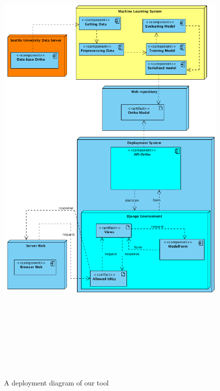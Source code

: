 \documentclass[12pt, french]{report}
\begin{document}
\begin{figure}[h]
	\includegraphics[width=17cm, height=24cm ]{images/deploymentdiag.png}
	\caption{A deployment diagram of our tool}
	\label{deployment}
\end{figure} 

%
\end{document}
